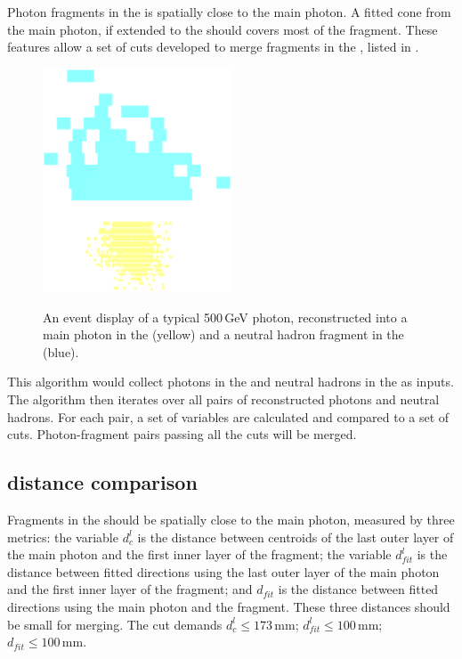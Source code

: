 Photon fragments in the \HCAL is  spatially close to the main photon. A fitted cone from the main photon, if extended to the \HCAL should covers most of the fragment. These features allow a set of cuts developed to merge  fragments in the \HCAL, listed in .

\begin{figure}[tbph]
\centering
{\includegraphics[width=0.5\textwidth]{photon/hcalfrag}}%
\caption{An event display of a typical 500\,GeV photon, reconstructed into a main photon in the \ECAL (yellow) and a neutral hadron fragment in the \HCAL (blue).}
\label{fig:photonEvtDspHCalFrag}
\end{figure}

This algorithm would collect photons in the \ECAL and neutral hadrons in the \HCAL as inputs. The algorithm then iterates over all pairs of reconstructed photons and neutral hadrons. For each pair, a set of variables are calculated and compared to a set of cuts. Photon-fragment pairs passing all the cuts will be merged.

\subsection{distance comparison}

Fragments in the \HCAL should be spatially close to the main photon, measured by three metrics: the variable $d^l_c$ is the distance between centroids of the last outer layer of the main photon and the first inner layer of the fragment; the variable $d^l_{fit}$ is the distance between fitted directions using the last outer layer of the main photon and the first inner layer of the fragment; and $d_{fit}$ is the distance between fitted directions using the main photon and the fragment. These three distances should be small for merging. The cut demands $d^l_c \leqslant 173\,\text{mm}$; $d^l_{fit} \leqslant 100\,\text{mm}$; $d_{fit} \leqslant 100\,\text{mm}$.

